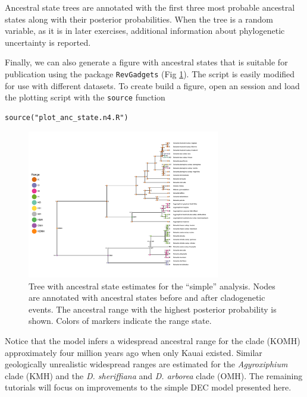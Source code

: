 Ancestral state trees are annotated with the first three most probable ancestral states along with their posterior probabilities.
When the tree is a random variable, as it is in later exercises, additional information about phylogenetic uncertainty is reported.

Finally, we can also generate a figure with ancestral states that is suitable for publication using the \R package {\tt RevGadgets} (Fig \ref{fig:simple_RevGadgets_ase}).
The script is easily modified for use with different datasets.
To create build a figure, open an \R session and load the plotting script with the {\tt source} function
\begin{snugshade}
\begin{lstlisting}
source("plot_anc_state.n4.R")
\end{lstlisting}
\end{snugshade}

\begin{figure}[!ht]
\centering
\includegraphics[width=0.75\textwidth]{figures/fig_simple_RevGadgets_ase.pdf}
\caption{Tree with ancestral state estimates for the ``simple'' analysis. Nodes are annotated with ancestral states before and after cladogenetic events. The ancestral range with the highest posterior probability is shown. Colors of markers indicate the range state.}
\label{fig:simple_RevGadgets_ase}
\end{figure}

Notice that the model infers a widespread ancestral range for the clade (KOMH) approximately four million years ago when only Kauai existed.
Similar geologically unrealistic widespread ranges are estimated for the {\it Agyroxiphium} clade (KMH) and the {\it D. sheriffiana} and {\it D. arborea} clade (OMH).
The remaining tutorials will focus on improvements to the simple DEC model presented here.

\newpage
